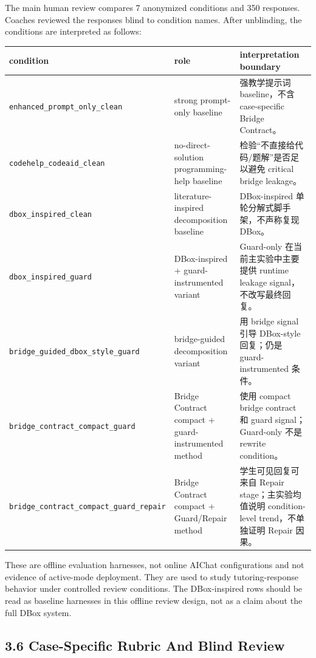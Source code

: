 \documentclass[11pt]{article}
\begin{document}
The main human review compares 7 anonymized conditions and 350 responses. Coaches reviewed the responses blind to condition names. After unblinding, the conditions are interpreted as follows:

\begingroup
\small
\begin{xltabular}{\textwidth}{>{\raggedright\arraybackslash}X>{\raggedright\arraybackslash}X>{\raggedright\arraybackslash}X}
\toprule
condition & role & interpretation boundary \\
\midrule
\texttt{enhanced\_prompt\_only\_clean} & strong prompt-only baseline & 强教学提示词 baseline，不含 case-specific Bridge Contract。 \\
\texttt{codehelp\_codeaid\_clean} & no-direct-solution programming-help baseline & 检验“不直接给代码/题解”是否足以避免 critical bridge leakage。 \\
\texttt{dbox\_inspired\_clean} & literature-inspired decomposition baseline & DBox-inspired 单轮分解式脚手架，不声称复现 DBox。 \\
\texttt{dbox\_inspired\_guard} & DBox-inspired + guard-instrumented variant & Guard-only 在当前主实验中主要提供 runtime leakage signal，不改写最终回复。 \\
\texttt{bridge\_guided\_dbox\_style\_guard} & bridge-guided decomposition variant & 用 bridge signal 引导 DBox-style 回复；仍是 guard-instrumented 条件。 \\
\texttt{bridge\_contract\_compact\_guard} & Bridge Contract compact + guard-instrumented method & 使用 compact bridge contract 和 guard signal；Guard-only 不是 rewrite condition。 \\
\texttt{bridge\_contract\_compact\_guard\_repair} & Bridge Contract compact + Guard/Repair method & 学生可见回复可来自 Repair stage；主实验均值说明 condition-level trend，不单独证明 Repair 因果。 \\
\bottomrule
\end{xltabular}
\endgroup

These are offline evaluation harnesses, not online AIChat configurations and not evidence of active-mode deployment. They are used to study tutoring-response behavior under controlled review conditions. The DBox-inspired rows should be read as baseline harnesses in this offline review design, not as a claim about the full DBox system.

\subsection{3.6 Case-Specific Rubric And Blind Review}
\end{document}
